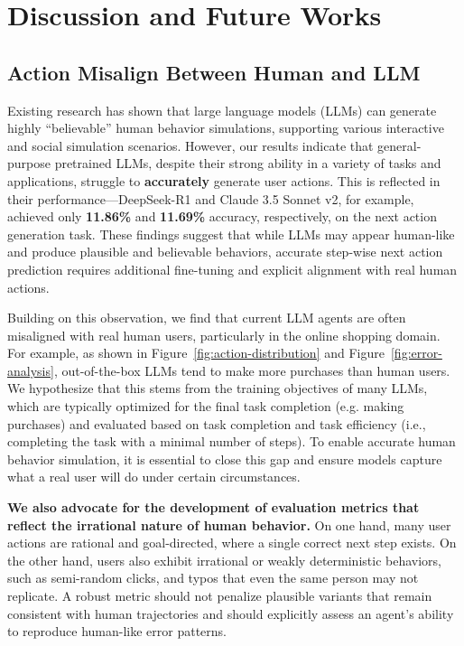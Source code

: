 \documentclass{article} %
\begin{document}
\section{Discussion and Future Works}  

\subsection{Action Misalign Between Human and LLM}

Existing research has shown that large language models (LLMs) can generate highly ``believable'' human behavior simulations, supporting various interactive and social simulation scenarios.  
However, our results indicate that general-purpose pretrained LLMs, despite their strong ability in a variety of tasks and applications, struggle to \textbf{accurately} generate user actions.
This is reflected in their performance—DeepSeek-R1 and Claude 3.5 Sonnet v2, for example, achieved only \textbf{11.86\%} and \textbf{11.69\%} accuracy, respectively, on the next action generation task. These findings suggest that while LLMs may appear human-like and produce plausible and believable behaviors, accurate step-wise next action prediction requires additional fine-tuning and explicit alignment with real human actions.  

Building on this observation, we find that current LLM agents are often misaligned with real human users, particularly in the online shopping domain. For example, as shown in Figure~\ref{fig:action-distribution} and Figure~\ref{fig:error-analysis}, out-of-the-box LLMs tend to make more purchases than human users.
We hypothesize that this stems from the training objectives of many LLMs, which are typically optimized for the final task completion (e.g. making purchases) and evaluated based on task completion and task efficiency (i.e., completing the task with a minimal number of steps).
To enable accurate human behavior simulation, it is essential to close this gap and ensure models capture what a real user will do under certain circumstances.

\textbf{We also advocate for the development of evaluation metrics that reflect the irrational nature of human behavior.}
On one hand, many user actions are rational and goal-directed, where a single correct next step exists. On the other hand, users also exhibit irrational or weakly deterministic behaviors, such as semi-random clicks, and typos that even the same person may not replicate. 
A robust metric should not penalize plausible variants that remain consistent with human trajectories and should explicitly assess an agent's ability to reproduce human-like error patterns.
\end{document}
